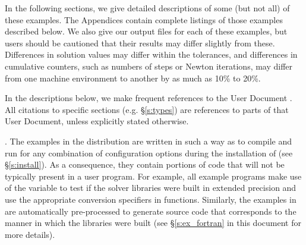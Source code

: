 \vspace{0.2in}\noindent 
In the following sections, we give detailed descriptions of some (but
not all) of these examples.  The Appendices contain complete listings
of those examples described below.  We also give our output files for
each of these examples, but users should be cautioned that their
results may differ slightly from these.  Differences in solution
values may differ within the tolerances, and differences in cumulative
counters, such as numbers of steps or Newton iterations, may differ
from one machine environment to another by as much as 10\% to 20\%.

In the descriptions below, we make frequent references to the {\kinsol}
User Document \cite{kinsol2.2.0_ug}.  All citations to specific sections
(e.g. \S\ref{s:types}) are references to parts of that User Document, unless
explicitly stated otherwise.

\vspace{0.2in}. 
The examples in the {\kinsol} distribution are written in such a way as
to compile and run for any combination of configuration options during
the installation of {\sundials} (see \S\ref{s:install}). As a consequence,
they contain portions of code that will not be typically present in a
user program. For example, all {\C} example programs make use of the
variable  to test if the solver libraries
were built in extended precision and use the appropriate conversion 
specifiers in  functions. Similarly, the {\F} examples in
{\fkinsol} are automatically pre-processed to generate source code that
corresponds to the manner in which the {\kinsol} libraries were built
(see \S\ref{s:ex_fortran} in this document for more details).

